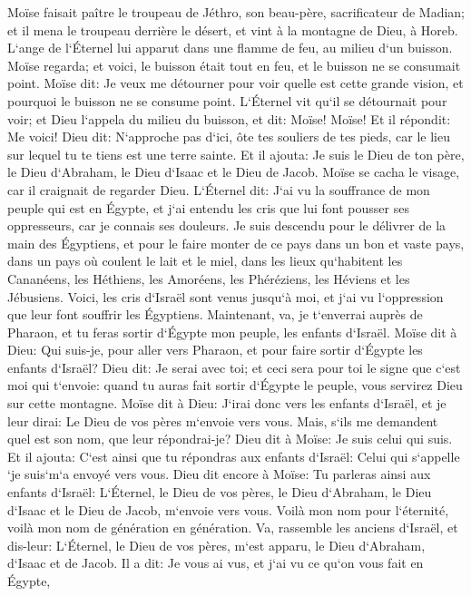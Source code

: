 \verse Moïse faisait paître le troupeau de Jéthro, son beau-père, sacrificateur de Madian; et il mena le troupeau derrière le désert, et vint à la montagne de Dieu, à Horeb. 
\verse L`ange de l`Éternel lui apparut dans une flamme de feu, au milieu d`un buisson. Moïse regarda; et voici, le buisson était tout en feu, et le buisson ne se consumait point. 
\verse Moïse dit: Je veux me détourner pour voir quelle est cette grande vision, et pourquoi le buisson ne se consume point. 
\verse L`Éternel vit qu`il se détournait pour voir; et Dieu l`appela du milieu du buisson, et dit: Moïse! Moïse! Et il répondit: Me voici! 
\verse Dieu dit: N`approche pas d`ici, ôte tes souliers de tes pieds, car le lieu sur lequel tu te tiens est une terre sainte. 
\verse Et il ajouta: Je suis le Dieu de ton père, le Dieu d`Abraham, le Dieu d`Isaac et le Dieu de Jacob. Moïse se cacha le visage, car il craignait de regarder Dieu. 
\verse L`Éternel dit: J`ai vu la souffrance de mon peuple qui est en Égypte, et j`ai entendu les cris que lui font pousser ses oppresseurs, car je connais ses douleurs. 
\verse Je suis descendu pour le délivrer de la main des Égyptiens, et pour le faire monter de ce pays dans un bon et vaste pays, dans un pays où coulent le lait et le miel, dans les lieux qu`habitent les Cananéens, les Héthiens, les Amoréens, les Phéréziens, les Héviens et les Jébusiens. 
\verse Voici, les cris d`Israël sont venus jusqu`à moi, et j`ai vu l`oppression que leur font souffrir les Égyptiens. 
\verse Maintenant, va, je t`enverrai auprès de Pharaon, et tu feras sortir d`Égypte mon peuple, les enfants d`Israël. 
\verse Moïse dit à Dieu: Qui suis-je, pour aller vers Pharaon, et pour faire sortir d`Égypte les enfants d`Israël? 
\verse Dieu dit: Je serai avec toi; et ceci sera pour toi le signe que c`est moi qui t`envoie: quand tu auras fait sortir d`Égypte le peuple, vous servirez Dieu sur cette montagne. 
\verse Moïse dit à Dieu: J`irai donc vers les enfants d`Israël, et je leur dirai: Le Dieu de vos pères m`envoie vers vous. Mais, s`ils me demandent quel est son nom, que leur répondrai-je? 
\verse Dieu dit à Moïse: Je suis celui qui suis. Et il ajouta: C`est ainsi que tu répondras aux enfants d`Israël: Celui qui s`appelle `je suis`m`a envoyé vers vous. 
\verse Dieu dit encore à Moïse: Tu parleras ainsi aux enfants d`Israël: L`Éternel, le Dieu de vos pères, le Dieu d`Abraham, le Dieu d`Isaac et le Dieu de Jacob, m`envoie vers vous. Voilà mon nom pour l`éternité, voilà mon nom de génération en génération. 
\verse Va, rassemble les anciens d`Israël, et dis-leur: L`Éternel, le Dieu de vos pères, m`est apparu, le Dieu d`Abraham, d`Isaac et de Jacob. Il a dit: Je vous ai vus, et j`ai vu ce qu`on vous fait en Égypte, 

